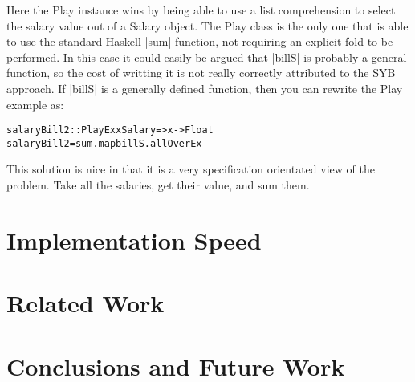 \documentclass[preprint]{sigplanconf}
\newenvironment{code}{\begin{alltt}\small}{\end{alltt}}
\begin{document}
    Here the Play instance wins by being able to use a list comprehension to select the salary value out of a Salary object. The Play class is the only one that is able to use the standard Haskell |sum| function, not requiring an explicit fold to be performed. In this case it could easily be argued that |billS| is probably a general function, so the cost of writting it is not really correctly attributed to the SYB approach. If |billS| is a generally defined function, then you can rewrite the Play example as:

\begin{code} %
salaryBill2 :: PlayEx x Salary => x -> Float
salaryBill2 = sum . map billS . allOverEx
\end{code}

    This solution is nice in that it is a very specification orientated view of the problem. Take all the salaries, get their value, and sum them.



\section{Implementation Speed}

\section{Related Work}

\section{Conclusions and Future Work}
\end{document}
